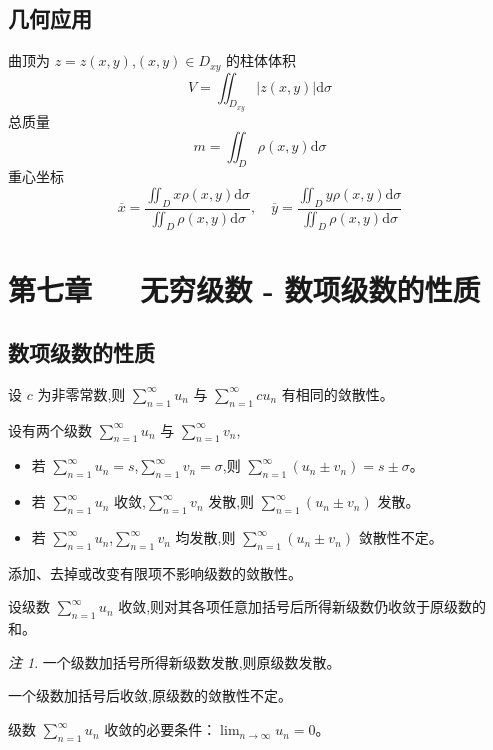 \documentclass[UTF8]{ctexart}
\theoremstyle{remark}
\newtheorem{remark}{注}
\begin{document}
	\subsection{几何应用}
	曲顶为 \(z = z(x,y)\),\((x,y) \in D_{xy}\) 的柱体体积
	\[
	V = \iint_{D_{xy}} |z(x,y)| \mathrm{d}\sigma
	\]
	总质量
	\[
	m = \iint_{D} \rho(x,y) \mathrm{d}\sigma
	\]
	重心坐标
	\[
	\overline{x} = \frac{\iint_{D} x\rho(x,y) \mathrm{d}\sigma}{\iint_{D} \rho(x,y) \mathrm{d}\sigma}, \quad \overline{y} = \frac{\iint_{D} y\rho(x,y) \mathrm{d}\sigma}{\iint_{D} \rho(x,y) \mathrm{d}\sigma}
	\]
	
	\section{第七章~~~无穷级数 - 数项级数的性质}
		
		\subsection{数项级数的性质}
		\begin{enumerate}
			\item 设 \(c\) 为非零常数,则 \(\sum_{n = 1}^{\infty} u_n\) 与 \(\sum_{n = 1}^{\infty} cu_n\) 有相同的敛散性。
			\item 设有两个级数 \(\sum_{n = 1}^{\infty} u_n\) 与 \(\sum_{n = 1}^{\infty} v_n\),
			\begin{itemize}
				\item 若 \(\sum_{n = 1}^{\infty} u_n = s\),\(\sum_{n = 1}^{\infty} v_n = \sigma\),则 \(\sum_{n = 1}^{\infty} (u_n \pm v_n)=s \pm \sigma\)。
				\item 若 \(\sum_{n = 1}^{\infty} u_n\) 收敛,\(\sum_{n = 1}^{\infty} v_n\) 发散,则 \(\sum_{n = 1}^{\infty} (u_n \pm v_n)\) 发散。
				\item 若 \(\sum_{n = 1}^{\infty} u_n\),\(\sum_{n = 1}^{\infty} v_n\) 均发散,则 \(\sum_{n = 1}^{\infty} (u_n \pm v_n)\) 敛散性不定。
			\end{itemize}
			\item 添加、去掉或改变有限项不影响级数的敛散性。
			\item 设级数 \(\sum_{n = 1}^{\infty} u_n\) 收敛,则对其各项任意加括号后所得新级数仍收敛于原级数的和。
			\begin{remark}
				\item 一个级数加括号所得新级数发散,则原级数发散。
				\item 一个级数加括号后收敛,原级数的敛散性不定。
			\end{remark}
			\item 级数 \(\sum_{n = 1}^{\infty} u_n\) 收敛的必要条件：\(\lim_{n \to \infty} u_n = 0\)。
		\end{enumerate}
		
\end{document}
